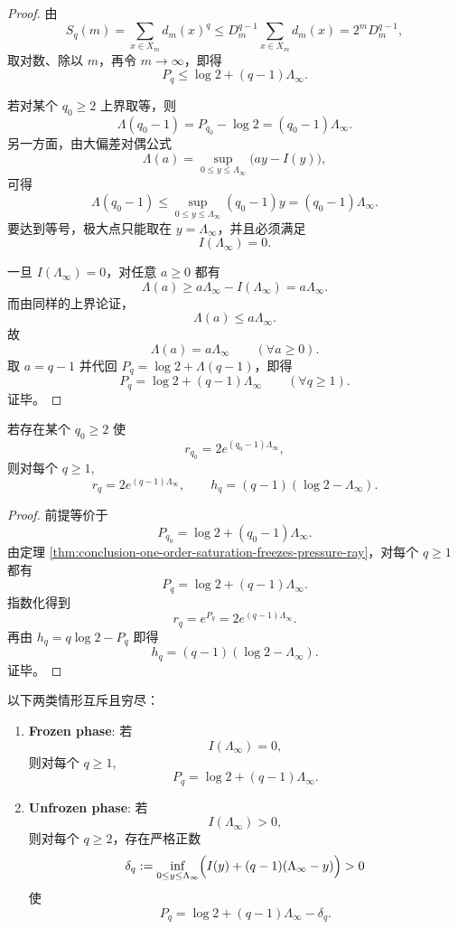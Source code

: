 \begin{proof}
由
\[
S_q(m)=\sum_{x\in X_m}d_m(x)^q
\le D_m^{q-1}\sum_{x\in X_m}d_m(x)
=2^mD_m^{q-1},
\]
取对数、除以 \(m\)，再令 \(m\to\infty\)，即得
\[
P_q\le \log 2+(q-1)\Lambda_\infty.
\]

若对某个 \(q_0\ge 2\) 上界取等，则
\[
\Lambda(q_0-1)=P_{q_0}-\log 2=(q_0-1)\Lambda_\infty.
\]
另一方面，由大偏差对偶公式
\[
\Lambda(a)=\sup_{0\le y\le \Lambda_\infty}\bigl(ay-I(y)\bigr),
\]
可得
\[
\Lambda(q_0-1)
\le
\sup_{0\le y\le \Lambda_\infty}(q_0-1)y
=(q_0-1)\Lambda_\infty.
\]
要达到等号，极大点只能取在 \(y=\Lambda_\infty\)，并且必须满足
\[
I(\Lambda_\infty)=0.
\]

一旦 \(I(\Lambda_\infty)=0\)，对任意 \(a\ge 0\) 都有
\[
\Lambda(a)\ge a\Lambda_\infty-I(\Lambda_\infty)=a\Lambda_\infty.
\]
而由同样的上界论证，
\[
\Lambda(a)\le a\Lambda_\infty.
\]
故
\[
\Lambda(a)=a\Lambda_\infty\qquad(\forall a\ge 0).
\]
取 \(a=q-1\) 并代回 \(P_q=\log 2+\Lambda(q-1)\)，即得
\[
P_q=\log 2+(q-1)\Lambda_\infty
\qquad(\forall q\ge 1).
\]
证毕。
\end{proof}

\begin{corollary}[单阶谱半径饱和的全阶刚化]\label{cor:conclusion-one-order-spectral-radius-saturation-freezes-all-orders}
若存在某个 \(q_0\ge 2\) 使
\[
r_{q_0}=2e^{(q_0-1)\Lambda_\infty},
\]
则对每个 \(q\ge 1\),
\[
r_q=2e^{(q-1)\Lambda_\infty},
\qquad
h_q=(q-1)(\log 2-\Lambda_\infty).
\]
\end{corollary}

\begin{proof}
前提等价于
\[
P_{q_0}=\log 2+(q_0-1)\Lambda_\infty.
\]
由定理 \ref{thm:conclusion-one-order-saturation-freezes-pressure-ray}，对每个 \(q\ge 1\) 都有
\[
P_q=\log 2+(q-1)\Lambda_\infty.
\]
指数化得到
\[
r_q=e^{P_q}=2e^{(q-1)\Lambda_\infty}.
\]
再由 \(h_q=q\log 2-P_q\) 即得
\[
h_q=(q-1)(\log 2-\Lambda_\infty).
\]
证毕。
\end{proof}

\begin{theorem}\label{thm:conclusion-pressure-spectrum-sharp-frozen-unfrozen-dichotomy}
以下两类情形互斥且穷尽：
\begin{enumerate}
  \item \textbf{Frozen phase}: 若
  \[
  I(\Lambda_\infty)=0,
  \]
  则对每个 \(q\ge 1\),
  \[
  P_q=\log 2+(q-1)\Lambda_\infty.
  \]
  \item \textbf{Unfrozen phase}: 若
  \[
  I(\Lambda_\infty)>0,
  \]
  则对每个 \(q\ge 2\)，存在严格正数
  \[
  \delta_q:=\inf_{0\le y\le \Lambda_\infty}\Bigl(I(y)+(q-1)(\Lambda_\infty-y)\Bigr)>0
  \]
  使
  \[
  P_q=\log 2+(q-1)\Lambda_\infty-\delta_q.
  \]
\end{enumerate}
\end{theorem}


